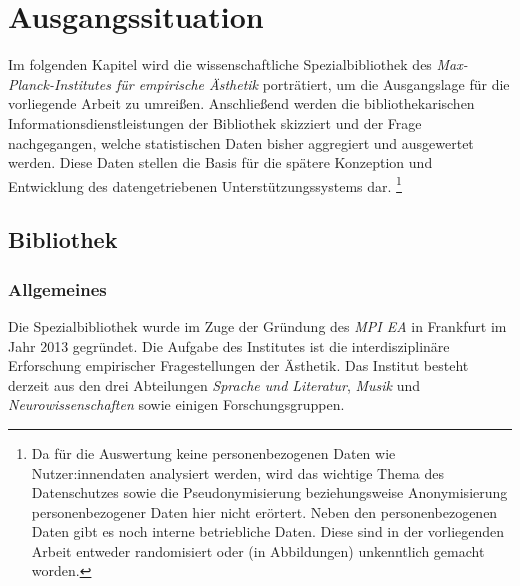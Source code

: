 \chapter{Ausgangssituation}
\label{chap:three}
Im folgenden Kapitel wird die wissenschaftliche Spezialbibliothek des \textit{Max-Planck-Institutes für empirische Ästhetik} porträtiert,
um die Ausgangslage für die vorliegende Arbeit zu umreißen.
Anschließend werden die bibliothekarischen Informationsdienstleistungen der Bibliothek skizziert und der Frage nachgegangen, 
welche statistischen Daten bisher aggregiert und ausgewertet werden. Diese Daten stellen die Basis für die spätere Konzeption und Entwicklung des datengetriebenen Unterstützungssystems dar.
\footnote{Da für die Auswertung keine personenbezogenen Daten wie Nutzer:innendaten analysiert werden, wird das wichtige Thema des Datenschutzes sowie
die Pseudonymisierung beziehungsweise Anonymisierung personenbezogener Daten hier nicht erörtert. Neben den personenbezogenen Daten gibt es noch interne betriebliche Daten. Diese sind in der vorliegenden Arbeit entweder 
randomisiert oder (in Abbildungen) unkenntlich gemacht worden. } 

\section{Bibliothek}
\label{chap:three_one}
\subsection{Allgemeines}
Die Spezialbibliothek wurde im Zuge der Gründung des \textit{\acrshort{MPI EA}}
in Frankfurt im Jahr 2013 gegründet. Die Aufgabe des Institutes ist die interdisziplinäre Erforschung 
empirischer Fragestellungen der Ästhetik. Das Institut besteht derzeit aus den drei Abteilungen \textit{Sprache und Literatur}, 
\textit{Musik} und \textit{Neurowissenschaften} sowie einigen Forschungsgruppen. %




